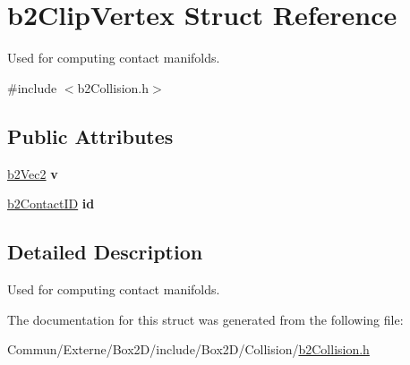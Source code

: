\hypertarget{structb2_clip_vertex}{}\section{b2\+Clip\+Vertex Struct Reference}
\label{structb2_clip_vertex}


Used for computing contact manifolds.  




{\ttfamily \#include $<$b2\+Collision.\+h$>$}

\subsection*{Public Attributes}
\begin{DoxyCompactItemize}
\item 
\hyperlink{structb2_vec2}{b2\+Vec2} {\bfseries v}\hypertarget{structb2_clip_vertex_a6c8d8e4c0667755d5295a9c0d91d5b87}{}\label{structb2_clip_vertex_a6c8d8e4c0667755d5295a9c0d91d5b87}

\item 
\hyperlink{unionb2_contact_i_d}{b2\+Contact\+ID} {\bfseries id}\hypertarget{structb2_clip_vertex_ac0f6d48eafc40a665bc18d4aa821689d}{}\label{structb2_clip_vertex_ac0f6d48eafc40a665bc18d4aa821689d}

\end{DoxyCompactItemize}


\subsection{Detailed Description}
Used for computing contact manifolds. 

The documentation for this struct was generated from the following file\+:\begin{DoxyCompactItemize}
\item 
Commun/\+Externe/\+Box2\+D/include/\+Box2\+D/\+Collision/\hyperlink{b2_collision_8h}{b2\+Collision.\+h}\end{DoxyCompactItemize}
